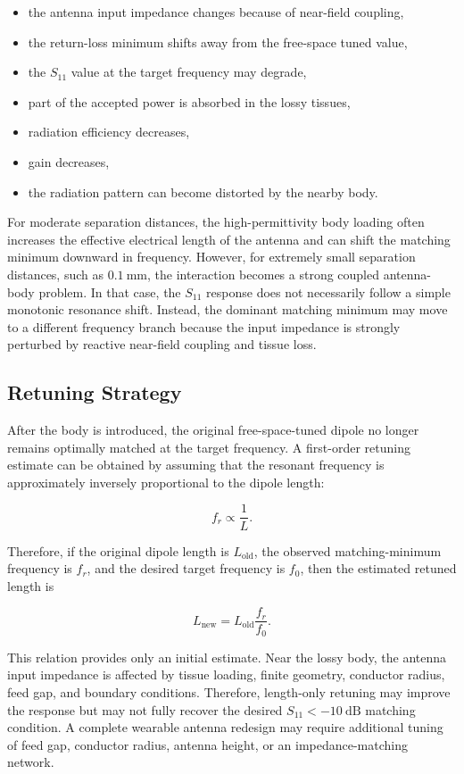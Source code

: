 \begin{itemize}
    \item the antenna input impedance changes because of near-field coupling,
    \item the return-loss minimum shifts away from the free-space tuned value,
    \item the \(S_{11}\) value at the target frequency may degrade,
    \item part of the accepted power is absorbed in the lossy tissues,
    \item radiation efficiency decreases,
    \item gain decreases,
    \item the radiation pattern can become distorted by the nearby body.
\end{itemize}

For moderate separation distances, the high-permittivity body loading often increases the effective electrical length of the antenna and can shift the matching minimum downward in frequency. However, for extremely small separation distances, such as \(0.1~\mathrm{mm}\), the interaction becomes a strong coupled antenna-body problem. In that case, the \(S_{11}\) response does not necessarily follow a simple monotonic resonance shift. Instead, the dominant matching minimum may move to a different frequency branch because the input impedance is strongly perturbed by reactive near-field coupling and tissue loss.

\subsection{Retuning Strategy}

After the body is introduced, the original free-space-tuned dipole no longer remains optimally matched at the target frequency. A first-order retuning estimate can be obtained by assuming that the resonant frequency is approximately inversely proportional to the dipole length:

\[
f_r \propto \frac{1}{L}.
\]

Therefore, if the original dipole length is \(L_{\mathrm{old}}\), the observed matching-minimum frequency is \(f_r\), and the desired target frequency is \(f_0\), then the estimated retuned length is

\[
L_{\mathrm{new}}
=
L_{\mathrm{old}}
\frac{f_r}{f_0}.
\]

This relation provides only an initial estimate. Near the lossy body, the antenna input impedance is affected by tissue loading, finite geometry, conductor radius, feed gap, and boundary conditions. Therefore, length-only retuning may improve the response but may not fully recover the desired \(S_{11}<-10~\mathrm{dB}\) matching condition. A complete wearable antenna redesign may require additional tuning of feed gap, conductor radius, antenna height, or an impedance-matching network.
